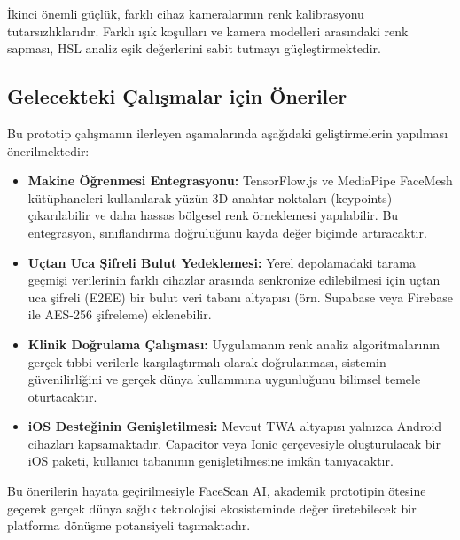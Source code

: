 İkinci önemli güçlük, farklı cihaz kameralarının renk kalibrasyonu tutarsızlıklarıdır. Farklı ışık koşulları ve kamera modelleri arasındaki renk sapması, HSL analiz eşik değerlerini sabit tutmayı güçleştirmektedir.

\subsection{Gelecekteki Çalışmalar için Öneriler}

Bu prototip çalışmanın ilerleyen aşamalarında aşağıdaki geliştirmelerin yapılması önerilmektedir:

\begin{itemize}
  \item \textbf{Makine Öğrenmesi Entegrasyonu:} TensorFlow.js ve MediaPipe FaceMesh kütüphaneleri kullanılarak yüzün 3D anahtar noktaları (keypoints) çıkarılabilir ve daha hassas bölgesel renk örneklemesi yapılabilir. Bu entegrasyon, sınıflandırma doğruluğunu kayda değer biçimde artıracaktır.
  \item \textbf{Uçtan Uca Şifreli Bulut Yedeklemesi:} Yerel depolamadaki tarama geçmişi verilerinin farklı cihazlar arasında senkronize edilebilmesi için uçtan uca şifreli (E2EE) bir bulut veri tabanı altyapısı (örn. Supabase veya Firebase ile AES-256 şifreleme) eklenebilir.
  \item \textbf{Klinik Doğrulama Çalışması:} Uygulamanın renk analiz algoritmalarının gerçek tıbbi verilerle karşılaştırmalı olarak doğrulanması, sistemin güvenilirliğini ve gerçek dünya kullanımına uygunluğunu bilimsel temele oturtacaktır.
  \item \textbf{iOS Desteğinin Genişletilmesi:} Mevcut TWA altyapısı yalnızca Android cihazları kapsamaktadır. Capacitor veya Ionic çerçevesiyle oluşturulacak bir iOS paketi, kullanıcı tabanının genişletilmesine imkân tanıyacaktır.
\end{itemize}

Bu önerilerin hayata geçirilmesiyle FaceScan AI, akademik prototipin ötesine geçerek gerçek dünya sağlık teknolojisi ekosisteminde değer üretebilecek bir platforma dönüşme potansiyeli taşımaktadır.
